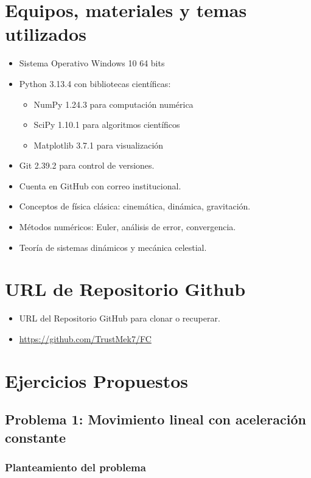 \documentclass{article}
\begin{document}
\begin{center}
\section{Equipos, materiales y temas utilizados}
	\begin{itemize}
		\item Sistema Operativo Windows 10 64 bits 
		\item Python 3.13.4 con bibliotecas científicas:
		\begin{itemize}
			\item NumPy 1.24.3 para computación numérica
			\item SciPy 1.10.1 para algoritmos científicos
			\item Matplotlib 3.7.1 para visualización
		\end{itemize}
		\item Git 2.39.2 para control de versiones.
		\item Cuenta en GitHub con correo institucional.
		\item Conceptos de física clásica: cinemática, dinámica, gravitación.
		\item Métodos numéricos: Euler, análisis de error, convergencia.
		\item Teoría de sistemas dinámicos y mecánica celestial.
	\end{itemize}  

\section{URL de Repositorio Github}
	\begin{itemize}
		\item URL del Repositorio GitHub para clonar o recuperar.
		\item \url{https://github.com/TrustMek7/FC}
	\end{itemize}

	\section{Ejercicios Propuestos}

	\subsection{Problema 1: Movimiento lineal con aceleración constante}
	
	\subsubsection{Planteamiento del problema}
	

\end{center}
\end{document}

